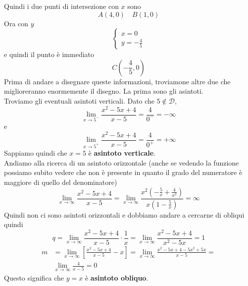 Quindi i due punti di intersezione con $x$ sono
\begin{equation*}
  A(4,0)\quad B(1,0)
\end{equation*}
Ora con $y$
\begin{equation*}
  \begin{cases}
    x=0\\
    y=-\frac{4}{5}
  \end{cases}
\end{equation*}
e quindi il punto è immediato
\begin{equation*}
  C \left( -\frac{4}{5},0 \right)
\end{equation*}
Prima di andare a disegnare queste informazioni, troviamone altre due che miglioreranno enormemente
il disegno. La prima sono gli asintoti.\\
Troviamo gli eventuali asintoti verticali. Dato che $5\notin\mathcal{D}$,
\begin{equation*}
  \lim\limits_{x\to5^-} \frac{x^2-5x+4}{x-5} = \frac{4}{0^-} = -\infty
\end{equation*}
e
\begin{equation*}
  \lim\limits_{x\to5^+} \frac{x^2-5x+4}{x-5} = \frac{4}{0^+}= +\infty
\end{equation*}
Sappiamo quindi che $x=5$ è \textbf{asintoto verticale}.\\
Andiamo alla ricerca di un asintoto orizzontale (anche se vedendo la funzione possiamo subito
vedere che non è presente in quanto il grado del numeratore è maggiore di quello del denominatore)
\begin{equation*}
  \lim\limits_{x\to\infty} \frac{x^2-5x+4}{x-5} = 
  \lim\limits_{x\to\infty} 
  \frac{x^2\left(-\frac{5}{x}+\frac{4}{x^2}\right)}{x\left(1-\frac{5}{x}\right)}=
  \infty
\end{equation*}
Quindi non ci sono asintoti orizzontali e dobbiamo andare a cercarne di obliqui quindi
\begin{equation*}
  q = \lim\limits_{x\to\infty} \frac{x^2-5x+4}{x-5}\cdot \frac{1}{x} =
  \lim\limits_{x\to\infty} \frac{x^2-5x+4}{x^2-5x} = 1
\end{equation*}
\begin{align*}
  m &= \lim\limits_{x\to\infty} \left[\frac{x^2-5x+4}{x-5}-x\right]=
  \lim\limits_{x\to\infty} \frac{x^2-5x+4-5x^2+5x}{x-5}=\\
  &\lim\limits_{x\to\infty} \frac{4}{x-5}=0
\end{align*}
Questo significa che $y=x$ è \textbf{asintoto obliquo}.\\

